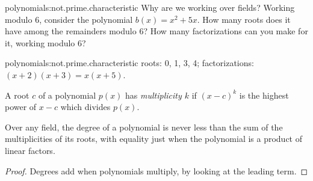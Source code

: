 \begin{problem}{polynomials:not.prime.characteristic}
Why are we working over fields?
Working modulo \(6\), consider the polynomial \(b(x)=x^2+5x\).
How many roots does it have among the remainders modulo \(6\)?
How many factorizations can you make for it, working modulo \(6\)?
\end{problem}
\begin{answer}{polynomials:not.prime.characteristic}
roots: 0, 1, 3, 4; factorizations: \((x+2)(x+3)=x(x+5)\).
\end{answer}
A root \(c\) of a polynomial \(p(x)\) has \emph{multiplicity \(k\)} if \((x-c)^k\) is the highest power of \(x-c\) which divides \(p(x)\).
\begin{corollary}
Over any field, the degree of a polynomial is never less than the sum of the multiplicities of its roots, with equality just when the polynomial is a product of linear factors.
\end{corollary}
\begin{proof}
Degrees add when polynomials multiply, by looking at the leading term.
\end{proof}

